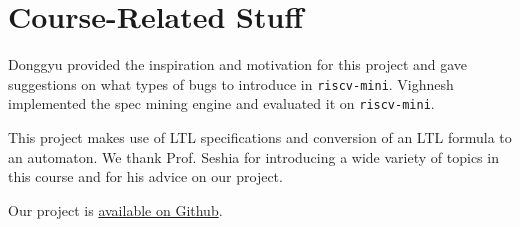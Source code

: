 \documentclass[acmlarge,11pt]{acmart}
\begin{document}
\section{Course-Related Stuff}
Donggyu provided the inspiration and motivation for this project and gave suggestions on what types of bugs to introduce in \texttt{riscv-mini}.
Vighnesh implemented the spec mining engine and evaluated it on \texttt{riscv-mini}.

This project makes use of LTL specifications and conversion of an LTL formula to an automaton.
We thank Prof. Seshia for introducing a wide variety of topics in this course and for his advice on our project.

Our project is \href{https://github.com/vighneshiyer/spec-mining/}{available on Github}.



\end{document}
